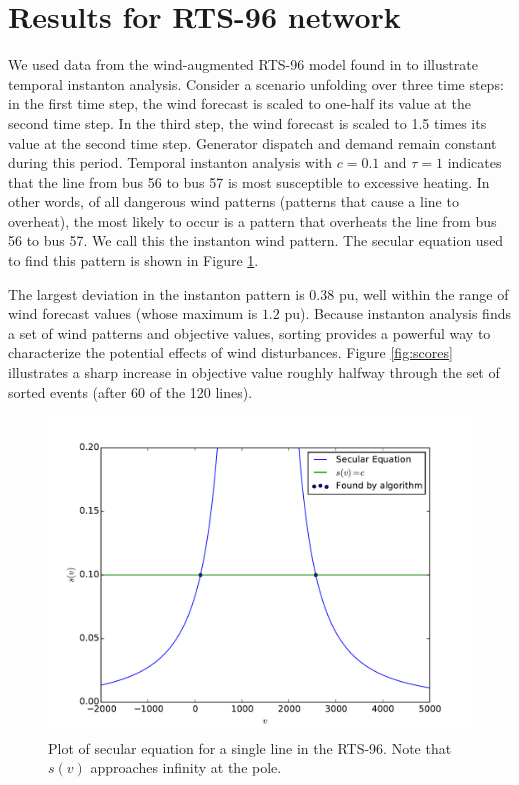 \documentclass[conference]{IEEEtran}
\begin{document}
\section{Results for RTS-96 network}\label{sec:results}

We used data from the wind-augmented RTS-96 model found in \cite{pandzic} to illustrate temporal instanton analysis. Consider a scenario unfolding over three time steps: in the first time step, the wind forecast is scaled to one-half its value at the second time step. In the third step, the wind forecast is scaled to 1.5 times its value at the second time step. Generator dispatch and demand remain constant during this period. Temporal instanton analysis with $c=0.1$ and $\tau=1$ indicates that the line from bus 56 to bus 57 is most susceptible to excessive heating. In other words, of all dangerous wind patterns (patterns that cause a line to overheat), the most likely to occur is a pattern that overheats the line from bus 56 to bus 57. We call this the instanton wind pattern. The secular equation used to find this pattern is shown in Figure \ref{fig:secular}.

The largest deviation in the instanton pattern is $0.38$ pu, well within the range of wind forecast values (whose maximum is $1.2$ pu). Because instanton analysis finds a set of wind patterns and objective values, sorting provides a powerful way to characterize the potential effects of wind disturbances. Figure \eqref{fig:scores} illustrates a sharp increase in objective value roughly halfway through the set of sorted events (after 60 of the 120 lines).

\begin{figure}
\centering
\includegraphics[width=1\linewidth]{../images/secular2}
\caption{Plot of secular equation for a single line in the RTS-96. Note that $s(v)$ approaches infinity at the pole.}
\label{fig:secular}
\end{figure}
\end{document}
